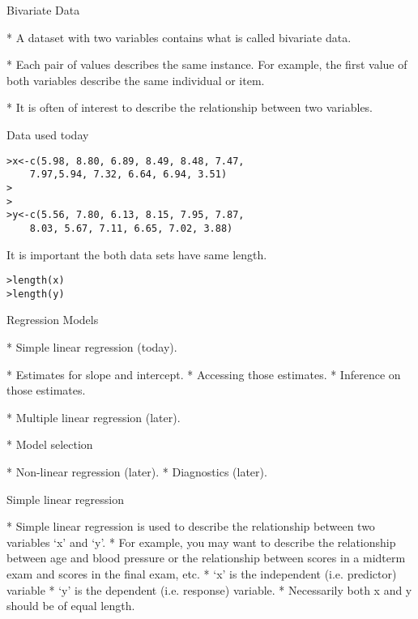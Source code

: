 

\begin{slide}{Bivariate Data}

\begin{itemize}
* A dataset with two variables contains what is called bivariate data.

* Each pair of values describes the same instance. For example, the first value of both variables describe the same individual or item.
    
* It is often of interest to describe the relationship between two variables.
\end{itemize}


\begin{slide}{Data used today}

\begin{verbatim}
>x<-c(5.98, 8.80, 6.89, 8.49, 8.48, 7.47,
    7.97,5.94, 7.32, 6.64, 6.94, 3.51)
>
>
>y<-c(5.56, 7.80, 6.13, 8.15, 7.95, 7.87,
    8.03, 5.67, 7.11, 6.65, 7.02, 3.88)

\end{verbatim}
It is important the both data sets have same length.
\begin{verbatim}
>length(x)
>length(y)

\end{verbatim}


\begin{slide}{Regression Models}

\begin{itemize}
* Simple linear regression (today).
    \begin{itemize}
    * Estimates for slope and intercept.
    * Accessing those estimates.
    * Inference on those estimates.
    \end{itemize}
* Multiple linear regression (later).
    \begin{itemize}
    * Model selection
    \end{itemize}
* Non-linear regression (later).
* Diagnostics (later).
\end{itemize}

\begin{slide}{Simple linear regression}
\begin{itemize}
* Simple linear regression is used to describe the relationship
between two variables `x' and `y'. * For example, you may want to describe the
relationship between age and blood pressure or the relationship
between scores in a midterm exam and scores in the final exam,
etc.
* `x' is the independent (i.e. predictor) variable
* `y' is the dependent (i.e. response) variable.
* Necessarily both x and y should be of equal length.


\end{itemize}
\end{slide}
\end{slide}
\end{slide}
\end{slide}
